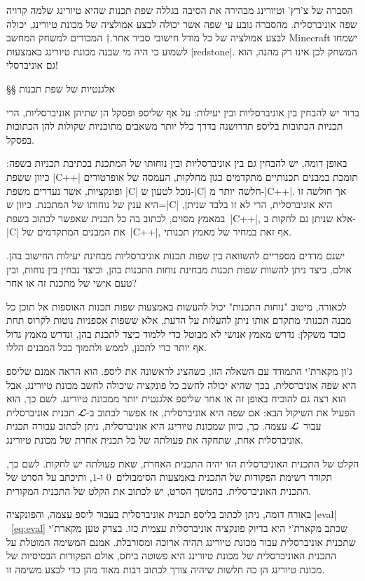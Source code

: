 הסברה של צ'רץ' וטיורינג מבהירה את הסיבה בגללה שפת תכנות שהיא טיורינג שלמה קרויה
שפה אוניברסלית. מהסברה נובע עי שפה אשר יכולה לבצע אמולציה של מכונת טיורינג,
יכולה לבצע אמולציה של כל מודל חישובי סביר אחר.†{%
  המכורים למשחק המחשב Minecraft ישמחו לשמוע כי היה מי שבנה מכונת טיורינג
  באמצעות \E|redstone|. המשחק לכן אינו רק מהנה, הוא גם אוניברסלי!}

§§ אלגנטיות של שפת תכנות

ברור יש להבחין בין אוניברסליות ובין יעילות: על אף שליספ ופסקל הן שתיהן
אוניברסליות, הרי תכניות הכתובות בליספ תדרושנה בדרך כלל יותר משאבים מתוכניות
שקולות להן הכתובות בפסקל.

באופן דומה, יש להבחין גם בין אוניברסליות ובין נוחותו של המתכנת בכתיבת תכניות
בשפה: כיוון ששפת \E|C++| תומכת במבנים תכנותיים מתקדמים כגון מחלקות, העמסה של
אופרטורים ופונקציות, אשר נעדרים משפת \E|C| נוכל לטעון ש-\E|C| חלשה יותר
מ-\E|C++|. אך חולשה זו היא ענין של נוחותו של המתכנת. כיוון ש=\E|C| היא
אוניברסלית, הרי לא זו בלבד שניתן, במאמץ מסוים, לכתוב בה כל תכנית שאפשר לכתוב
בשפת~\E|C++|, אלא שניתן גם לחקות ב-\E|C| את המבנים המתקדמים של~\E|C++|, אף זאת
במחיר של מאמץ תכנותי.

ישנם מדדים מספריים להשוואה בין שפות תכנות אוניברסליות מבחינת יעילות החישוב בהן.
אולם, כיצד ניתן להשוות שפות תכנות מבחינת נוחות התכנות בהן, וכיצד נבחין בין
נוחות, ובין טעם אישי של מתכנת זה או אחר?

לכאורה, מיטוב "נוחות התכנות" יכול להעשות באמצעות שפות תכנות האוספות אל תוכן כל
מבנה תכנותי מתקדם אותו ניתן להעלות על הדעת, אלא ששפות אספניות נוטות לקרוס תחת
כובד משקלן: נדרש מאמץ אנושי לא מבוטל כדי ללמוד כיצד לתכנת בהן, ונדרש מאמץ גדול
אף יותר כדי לתכנן, לממש ולתמוך בכל המבנים הללו.

ג'ון מקארת'י התמודד עם השאלה הזו, כשהציג לראשונה את ליספ. הוא הראה אמנם שליספ
היא שפה אוניברסלית, בכך שהיא יכולה לחשב כל פונקציה שיכולה לחשב מכונת טיורינג,
אבל הוא רצה גם להוכיח באופן זה או אחר שליספ אלגנטית יותר ממכונת טיורינג. לשם
כך, הוא הפעיל את השיקול הבא: אם שפה היא אוניברסלית, אז אפשר לכתוב ב-$𝓛$ תכנית
אוניברסלית עבור~$𝓛$ עצמה. כך, כיוון שמכונת טיורינג היא אוניברסלית, ניתן לכתוב
עבורה תכנית אוניברסלית אחת, שתחקה את פעולתה של כל תכנית אחרת של מכונת טיורינג.

הקלט של התכנית האוניברסלית הזו יהיה התכנית האחרת, שאת פעולתה יש לחקות. לשם כך,
תקודד רשימת הפקודות של התכנית באמצעות הסימבולים~$0$ ו-$1$, ותיכתב על הסרט של
התכנית האוניברסלית. בהמשך הסרט, יש לכתוב את הקלט של התכנית המקורית.

באורח דומה, ניתן לכתוב בליספ תכנית אוניברסלית בעבור ליספ עצמה, והפונקציה
\E|eval|~\ref{eq:eval} שכתב מקארת'י היא בדיוק פונקציה אוניברסלית עצמית כזו.
בצדק טען מקארת'י שתכנית אוניברסלית עבור מכונת טיורינג תהיה ארוכה ומסורבלת.
אמנם המשימה המוטלת על התכנית האוניברסלית של מכונת טיורינג היא פשוטה ביחס, אולם
הפקודות הבסיסיות של מכונת טיורינג הן כה חלשות שיהיה צורך לכתוב רבות מאוד מהן
כדי לבצע משימה זו.

